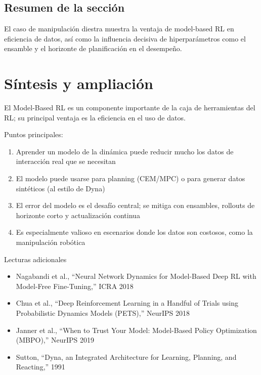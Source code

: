 \documentclass[a4paper]{article}
\begin{document}
\subsection{Resumen de la sección}

El caso de manipulación diestra muestra la ventaja de model-based RL en eficiencia de datos, así como la influencia decisiva de hiperparámetros como el ensamble y el horizonte de planificación en el desempeño.
\section{Síntesis y ampliación}

El Model-Based RL es un componente importante de la caja de herramientas del RL; su principal ventaja es la eficiencia en el uso de datos.

Puntos principales:
\begin{enumerate}
    \item Aprender un modelo de la dinámica puede reducir mucho los datos de interacción real que se necesitan
    \item El modelo puede usarse para planning (CEM/MPC) o para generar datos sintéticos (al estilo de Dyna)
    \item El error del modelo es el desafío central; se mitiga con ensambles, rollouts de horizonte corto y actualización continua
    \item Es especialmente valioso en escenarios donde los datos son costosos, como la manipulación robótica
\end{enumerate}

\begin{knowledgebox}{Lecturas adicionales}
\begin{itemize}
    \item Nagabandi et al., ``Neural Network Dynamics for Model-Based Deep RL with Model-Free Fine-Tuning,'' ICRA 2018
    \item Chua et al., ``Deep Reinforcement Learning in a Handful of Trials using Probabilistic Dynamics Models (PETS),'' NeurIPS 2018
    \item Janner et al., ``When to Trust Your Model: Model-Based Policy Optimization (MBPO),'' NeurIPS 2019
    \item Sutton, ``Dyna, an Integrated Architecture for Learning, Planning, and Reacting,'' 1991
\end{itemize}
\end{knowledgebox}
\end{document}
